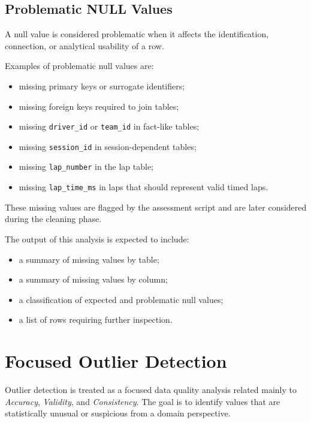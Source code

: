 \documentclass[a4paper,11pt]{article}
\begin{document}
	\subsection{Problematic NULL Values}
	
	A null value is considered problematic when it affects the identification, connection, or
	analytical usability of a row.
	
	Examples of problematic null values are:
	
	\begin{itemize}
		\item missing primary keys or surrogate identifiers;
		\item missing foreign keys required to join tables;
		\item missing \texttt{driver\_id} or \texttt{team\_id} in fact-like tables;
		\item missing \texttt{session\_id} in session-dependent tables;
		\item missing \texttt{lap\_number} in the lap table;
		\item missing \texttt{lap\_time\_ms} in laps that should represent valid timed laps.
	\end{itemize}
	
	These missing values are flagged by the assessment script and are later considered during
	the cleaning phase.
	
	The output of this analysis is expected to include:
	
	\begin{itemize}
		\item a summary of missing values by table;
		\item a summary of missing values by column;
		\item a classification of expected and problematic null values;
		\item a list of rows requiring further inspection.
	\end{itemize}


	
	\section{Focused Outlier Detection}
	
	Outlier detection is treated as a focused data quality analysis related mainly to
	\textit{Accuracy}, \textit{Validity}, and \textit{Consistency}. The goal is to identify
	values that are statistically unusual or suspicious from a domain perspective.
	
\end{document}
